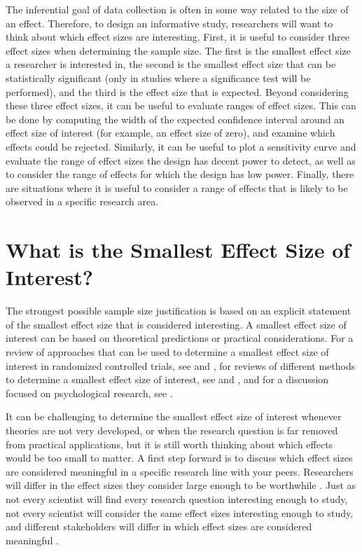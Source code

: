 \documentclass[
  oneside]{book}
\begin{document}
The inferential goal of data collection is often in some way related to the size of an effect. Therefore, to design an informative study, researchers will want to think about which effect sizes are interesting. First, it is useful to consider three effect sizes when determining the sample size. The first is the smallest effect size a researcher is interested in, the second is the smallest effect size that can be statistically significant (only in studies where a significance test will be performed), and the third is the effect size that is expected. Beyond considering these three effect sizes, it can be useful to evaluate ranges of effect sizes. This can be done by computing the width of the expected confidence interval around an effect size of interest (for example, an effect size of zero), and examine which effects could be rejected. Similarly, it can be useful to plot a sensitivity curve and evaluate the range of effect sizes the design has decent power to detect, as well as to consider the range of effects for which the design has low power. Finally, there are situations where it is useful to consider a range of effects that is likely to be observed in a specific research area.

\hypertarget{what-is-the-smallest-effect-size-of-interest}{%
\section{What is the Smallest Effect Size of Interest?}\label{what-is-the-smallest-effect-size-of-interest}}

The strongest possible sample size justification is based on an explicit statement of the smallest effect size that is considered interesting. A smallest effect size of interest can be based on theoretical predictions or practical considerations. For a review of approaches that can be used to determine a smallest effect size of interest in randomized controlled trials, see \citet{cook_assessing_2014} and \citet{keefe_defining_2013}, for reviews of different methods to determine a smallest effect size of interest, see \citet{king_point_2011} and \citet{copay_understanding_2007}, and for a discussion focused on psychological research, see \citet{lakens_equivalence_2018}.

It can be challenging to determine the smallest effect size of interest whenever theories are not very developed, or when the research question is far removed from practical applications, but it is still worth thinking about which effects would be too small to matter. A first step forward is to discuss which effect sizes are considered meaningful in a specific research line with your peers. Researchers will differ in the effect sizes they consider large enough to be worthwhile \citep{murphy_statistical_2014}. Just as not every scientist will find every research question interesting enough to study, not every scientist will consider the same effect sizes interesting enough to study, and different stakeholders will differ in which effect sizes are considered meaningful \citep{kelley_effect_2012}.
\end{document}
